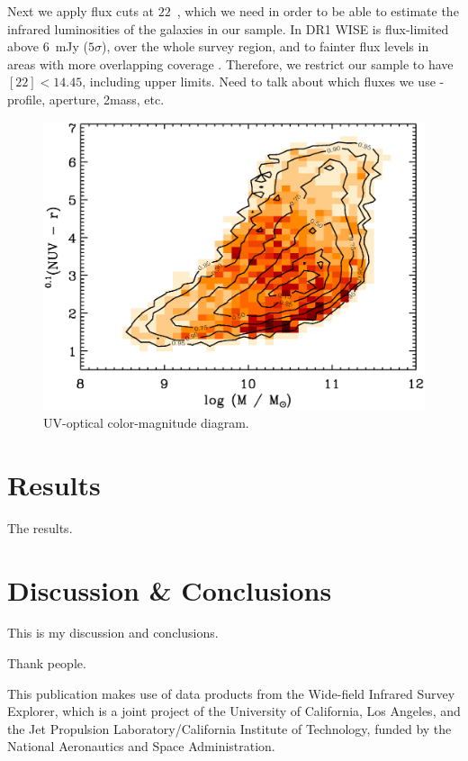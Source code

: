\documentclass{emulateapj}
\begin{document}
Next we apply flux cuts at $22$~\micron, which we need in order to be
able to estimate the infrared luminosities of the galaxies in our
sample.  In DR1 WISE is flux-limited above $6$~mJy ($5\sigma$), over
the whole survey region, and to fainter flux levels in areas with more
overlapping coverage \citep{wright10a}.  Therefore, we restrict our
sample to have $[22]<14.45$, including upper limits.  Need to talk
about which fluxes we use - profile, aperture, 2mass, etc.

\begin{figure}
\centering
\includegraphics[scale=0.4]{nuvmr_mass}
\caption{UV-optical color-magnitude diagram. \label{fig:nuvmr}} 
\end{figure}

\section{Results}\label{sec:results}
The results.

\section{Discussion \& Conclusions}\label{sec:discussion}  
This is my discussion and conclusions.

\acknowledgements
Thank people.  

This publication makes use of data products from the Wide-field
Infrared Survey Explorer, which is a joint project of the University
of California, Los Angeles, and the Jet Propulsion
Laboratory/California Institute of Technology, funded by the National
Aeronautics and Space Administration.




\end{document}
